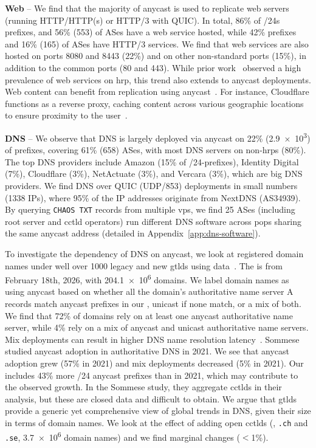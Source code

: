 \vspace{0.2em}\noindent\textbf{Web} --
We find that the majority of anycast is used to replicate web servers (running HTTP/HTTP(s) or HTTP/3 with QUIC).
In total, 86\% %
of /24s prefixes, and 56\% (553) of ASes have a web service hosted, while 42\% %
prefixes and 16\% (165) of ASes have HTTP/3 services.
We find that web services are also hosted on ports 8080 and 8443 (22\%) and on other non-standard ports (15\%), in addition to the common ports (80 and 443).
While prior work~\cite{SattlerEtAl_PackedBrimInvestigating_2023} observed a high prevalence of web services on \gls{hrp}, this trend also extends to anycast deployments.
Web content can benefit from replication using anycast~\cite{_CloudflareCache_2026, moura-anycast-ddos}.
For instance, Cloudflare functions as a reverse proxy, caching content across various geographic locations to ensure proximity to the user~\cite{cloudflare-dns}.

\vspace{0.2em}\noindent\textbf{DNS} --
We observe that DNS is largely deployed via anycast on 22\% (\num{2.9e3}) of prefixes, covering 61\% (658) ASes, with most DNS servers on non-\glspl{hrp} (80\%).
The top DNS providers include Amazon (15\% of /24-prefixes), Identity Digital (7\%), Cloudflare (3\%), NetActuate (3\%), and Vercara (3\%), which are big DNS providers.
We find DNS over QUIC (UDP/853) deployments in small numbers (\num{1338} IPs), where 95\% of the IP addresses originate from NextDNS (AS34939).
By querying \texttt{CHAOS TXT} records from multiple \glspl{vp}, we find 25 ASes (including root server and \gls{cctld} operators) run different DNS software across \glspl{pop} sharing the same anycast address (detailed in Appendix~\ref{app:dns-software}).

To investigate the dependency of DNS on anycast, we look at registered domain names under well over 1000 legacy and new \glspl{gtld} 
using \openintel data~\cite{openintel}.
The \dataset is from February 18th, 2026, with \num{204.1e6} domains.
We label domain names as using anycast based on whether all the domain's authoritative name server A records match anycast prefixes in our \dataset, unicast if none match, or a mix of both.
We find that 72\% of domains rely on at least one anycast authoritative name server, while 4\% rely on a mix of anycast and unicast authoritative name servers.
Mix deployments can result in higher DNS name resolution latency~\cite{moritz-recursive}.
Sommese \etal studied anycast adoption in authoritative DNS in 2021.
We see that anycast adoption grew (57\% in 2021) and mix deployments decreased (5\% in 2021).
Our \dataset includes 43\% more /24 anycast prefixes than in 2021, which may contribute to the observed growth.
In the Sommese \etal study, they aggregate \glspl{cctld} in their analysis, but these are closed data and difficult to obtain.
We argue that \glspl{gtld} provide a generic yet comprehensive view of global trends in DNS, given their size in terms of domain names.
We look at the effect of adding open \glspl{cctld} (\eg, \texttt{.ch} and \texttt{.se}, \num{3.7e6} domain names) and we find marginal changes ($<$1\%).

